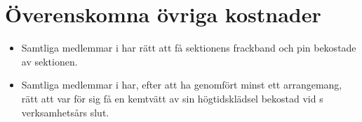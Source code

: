\documentclass[11pt, includeaddress]{classes/cthit}
\begin{document}
\section{Överenskomna övriga kostnader}
\begin{itemize}
	\item Samtliga medlemmar i \FANBARERIT{} har rätt att få sektionens frackband och pin bekostade av sektionen.
	\item Samtliga medlemmar i \FANBARERIT{} har, efter att ha genomfört minst ett arrangemang, rätt att var för sig få en kemtvätt av sin högtidsklädsel bekostad vid \FANBARERIT{}s verksamhetsårs slut.
\end{itemize}
\end{document}
